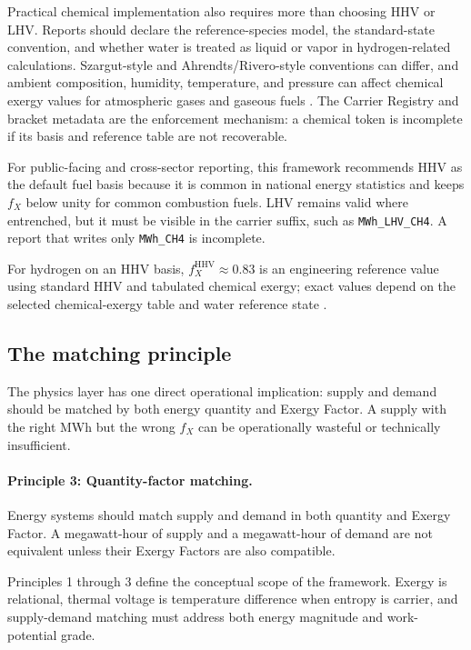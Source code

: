 \documentclass[11pt]{article}
\newcommand{\fx}{f_X}
\begin{document}
Practical chemical implementation also requires more than choosing HHV or LHV. Reports should declare the reference-species model, the standard-state convention, and whether water is treated as liquid or vapor in hydrogen-related calculations. Szargut-style and Ahrendts/Rivero-style conventions can differ, and ambient composition, humidity, temperature, and pressure can affect chemical exergy values for atmospheric gases and gaseous fuels \cite{ertesvag2007}. The Carrier Registry and bracket metadata are the enforcement mechanism: a chemical token is incomplete if its basis and reference table are not recoverable.

For public-facing and cross-sector reporting, this framework recommends HHV as the default fuel basis because it is common in national energy statistics and keeps $\fx$ below unity for common combustion fuels. LHV remains valid where entrenched, but it must be visible in the carrier suffix, such as \texttt{MWh\_LHV\_CH4}. A report that writes only \texttt{MWh\_CH4} is incomplete.

For hydrogen on an HHV basis, $\fx^{\mathrm{HHV}}\approx 0.83$ is an engineering reference value using standard HHV and tabulated chemical exergy; exact values depend on the selected chemical-exergy table and water reference state \cite{rivero2006,morris1986}.

\subsection{The matching principle}

The physics layer has one direct operational implication: supply and demand should be matched by both energy quantity and Exergy Factor. A supply with the right MWh but the wrong $\fx$ can be operationally wasteful or technically insufficient.

\paragraph{Principle 3: Quantity-factor matching.} Energy systems should match supply and demand in both quantity and Exergy Factor. A megawatt-hour of supply and a megawatt-hour of demand are not equivalent unless their Exergy Factors are also compatible.

Principles 1 through 3 define the conceptual scope of the framework. Exergy is relational, thermal voltage is temperature difference when entropy is carrier, and supply-demand matching must address both energy magnitude and work-potential grade.
\end{document}

